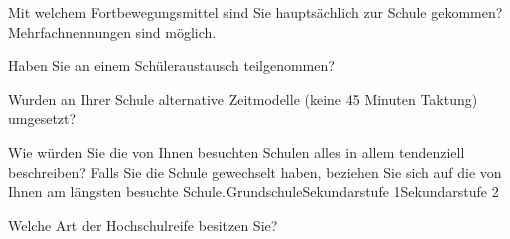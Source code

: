\separate

\begin{choicegroup}{Mit welchem Fortbewegungsmittel sind Sie hauptsächlich zur Schule gekommen?
\newline\footnotesize{Mehrfachnennungen sind möglich.}}

\end{choicegroup}

\separate

\begin{choicequestion}[1]{Haben Sie an einem Schüleraustausch teilgenommen?}
\end{choicequestion}

\separate

\begin{choicequestion}[1]{Wurden an Ihrer Schule alternative Zeitmodelle (keine 45 Minuten Taktung) umgesetzt?}
\end{choicequestion}

\separate

\begin{markgroupThree}{Wie würden Sie die von Ihnen besuchten Schulen alles in allem tendenziell beschreiben?
	\newline\footnotesize Falls Sie die Schule gewechselt haben, beziehen Sie sich auf die von Ihnen am längsten besuchte Schule.}{Grundschule}{Sekundarstufe 1}{Sekundarstufe 2}
\end{markgroupThree}%

\separate

\begin{choicequestion}[1]{Welche Art der Hochschulreife besitzen Sie?}
\end{choicequestion}

